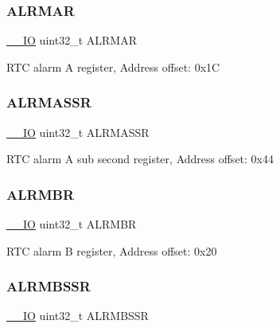 \subsubsection{\texorpdfstring{A\+L\+R\+M\+AR}{ALRMAR}}
{\footnotesize\ttfamily \mbox{\hyperlink{core__sc300_8h_aec43007d9998a0a0e01faede4133d6be}{\+\_\+\+\_\+\+IO}} uint32\+\_\+t A\+L\+R\+M\+AR}

R\+TC alarm A register, Address offset\+: 0x1C \mbox{\label{struct_r_t_c___type_def_a61282fa74cede526af85fd9d20513646}} 
\subsubsection{\texorpdfstring{A\+L\+R\+M\+A\+S\+SR}{ALRMASSR}}
{\footnotesize\ttfamily \mbox{\hyperlink{core__sc300_8h_aec43007d9998a0a0e01faede4133d6be}{\+\_\+\+\_\+\+IO}} uint32\+\_\+t A\+L\+R\+M\+A\+S\+SR}

R\+TC alarm A sub second register, Address offset\+: 0x44 \mbox{\label{struct_r_t_c___type_def_a4e513deb9f58a138ad9f317cc5a3555d}} 
\subsubsection{\texorpdfstring{A\+L\+R\+M\+BR}{ALRMBR}}
{\footnotesize\ttfamily \mbox{\hyperlink{core__sc300_8h_aec43007d9998a0a0e01faede4133d6be}{\+\_\+\+\_\+\+IO}} uint32\+\_\+t A\+L\+R\+M\+BR}

R\+TC alarm B register, Address offset\+: 0x20 \mbox{\label{struct_r_t_c___type_def_a4ef7499da5d5beb1cfc81f7be057a7b2}} 
\subsubsection{\texorpdfstring{A\+L\+R\+M\+B\+S\+SR}{ALRMBSSR}}
{\footnotesize\ttfamily \mbox{\hyperlink{core__sc300_8h_aec43007d9998a0a0e01faede4133d6be}{\+\_\+\+\_\+\+IO}} uint32\+\_\+t A\+L\+R\+M\+B\+S\+SR}

